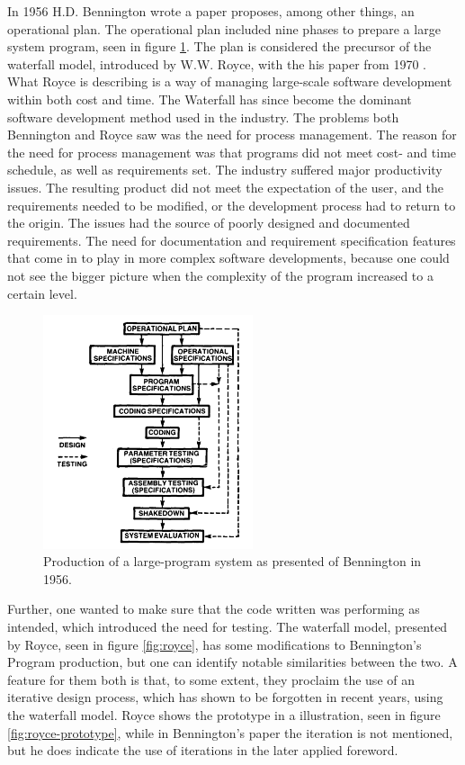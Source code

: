 In 1956 H.D. Bennington wrote a paper \cite{benington1983production} proposes, among other things, an operational plan. The operational plan included nine phases to prepare a large system program, seen in figure \ref{fig:bennington}. The plan is considered the precursor of the waterfall model, introduced by W.W. Royce, with the his paper from 1970 \cite{royce}. What Royce is describing is a way of managing large-scale software development within both cost and time. The Waterfall has since become the dominant software development method used in the industry. The problems both Bennington and Royce saw was the need for process management. The reason for the need for process management was that programs did not meet cost- and time schedule, as well as requirements set. The industry suffered major productivity issues. The resulting product did not meet the expectation of the user, and the requirements needed to be modified, or the development process had to return to the origin. The issues had the source of poorly designed and documented requirements. The need for documentation and requirement specification features that come in to play in more complex software developments, because one could not see the bigger picture when the complexity of the program increased to a certain level.

\begin{figure}
    \centering
    \includegraphics[width=0.55\textwidth]{fig/bennington-production-of-large-scale-programs.png}
    \caption{Production of a large-program system as presented of Bennington in 1956.}
    \label{fig:bennington}
\end{figure}

Further, one wanted to make sure that the code written was performing as intended, which introduced the need for testing. The waterfall model, presented by Royce, seen in figure \ref{fig:royce}, has some modifications to Bennington's Program production, but one can identify notable similarities between the two. A feature for them both is that, to some extent, they proclaim the use of an iterative design process, which has shown to be forgotten in recent years, using the waterfall model. Royce shows the prototype in a illustration, seen in figure \ref{fig:royce-prototype}, while in Bennington's paper the iteration is not mentioned, but he does indicate the use of iterations in the later applied foreword.

